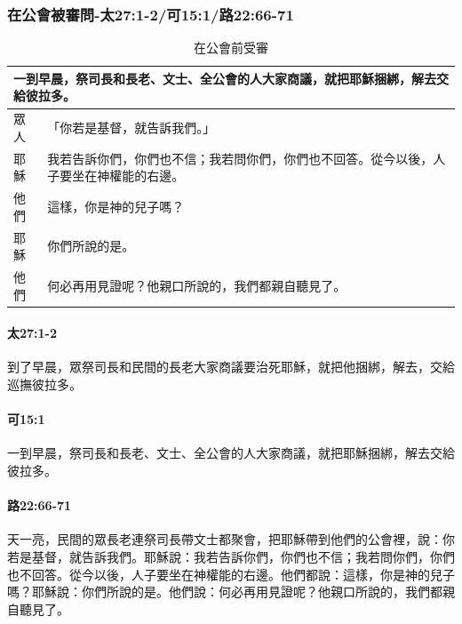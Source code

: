 \subsubsection{在公會被審問-太27:1-2/可15:1/路22:66-71}

\begin{table}[htbp]
  \centering
  
    \begin{tabular}{|p{2em}|p{42em}|}
    \toprule
    \multicolumn{2}{|p{44em}|}{一到早晨，祭司長和長老、文士、全公會的人大家商議，就把耶穌捆綁，解去交給彼拉多。} \\
    \midrule
    \textcolor[rgb]{ 0,  .075,  .125}{眾人} & 「你若是基督，就告訴我們。」 \\
    \midrule
    \textcolor[rgb]{ 0,  .075,  .125}{耶穌} & 我若告訴你們，你們也不信；我若問你們，你們也不回答。從今以後，人子要坐在神權能的右邊。 \\
    \midrule
    \textcolor[rgb]{ 0,  .075,  .125}{他們} & 這樣，你是神的兒子嗎？ \\
    \midrule
    \textcolor[rgb]{ 0,  .075,  .125}{耶穌} & 你們所說的是。 \\
    \midrule
    \textcolor[rgb]{ 0,  .075,  .125}{他們} & \textcolor[rgb]{ 0,  .075,  .125}{何必再用見證呢？他親口所說的，我們都親自聽見了。} \\
    \bottomrule
    \end{tabular}%
    \caption{在公會前受審}
  \label{tab:addlabel}%
\end{table}

\paragraph{太27:1-2}
到了早晨，眾祭司長和民間的長老大家商議要治死耶穌，就把他捆綁，解去，交給巡撫彼拉多。

\paragraph{可15:1}
一到早晨，祭司長和長老、文士、全公會的人大家商議，就把耶穌捆綁，解去交給彼拉多。

\paragraph{路22:66-71}
天一亮，民間的眾長老連祭司長帶文士都聚會，把耶穌帶到他們的公會裡，說：你若是基督，就告訴我們。耶穌說：我若告訴你們，你們也不信；我若問你們，你們也不回答。從今以後，人子要坐在神權能的右邊。他們都說：這樣，你是神的兒子嗎？耶穌說：你們所說的是。他們說：何必再用見證呢？他親口所說的，我們都親自聽見了。
